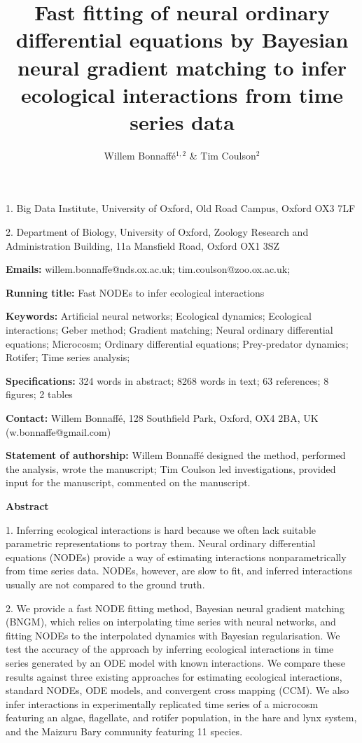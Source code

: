 \documentclass[11pt, oneside]{article}
\title{Fast fitting of neural ordinary differential equations by Bayesian neural gradient matching to infer ecological interactions from time series data}
\author{Willem Bonnaff\'e$^{1,2}$ \& Tim Coulson$^2$}
\date{}
\begin{document}
\maketitle
{}

1. Big Data Institute, University of Oxford, Old Road Campus, Oxford OX3 7LF 

2. Department of Biology, University of Oxford, Zoology Research and Administration Building, 11a Mansfield Road, Oxford OX1 3SZ 

\textbf{Emails:}
willem.bonnaffe@nds.ox.ac.uk;
tim.coulson@zoo.ox.ac.uk;

\textbf{Running title:}
Fast NODEs to infer ecological interactions

\textbf{Keywords:}
Artificial neural networks;
Ecological dynamics;  
Ecological interactions;
Geber method; 
Gradient matching;
Neural ordinary differential equations; 
Microcosm;
Ordinary differential equations; 
Prey-predator dynamics; 
Rotifer;
Time series analysis;

\textbf{Specifications:}  324 words in abstract; 8268 words in text; 63 references; 8 figures; 2 tables

\textbf{Contact:}
Willem Bonnaff\'e, 128 Southfield Park, Oxford, OX4 2BA, UK (w.bonnaffe@gmail.com)

\textbf{Statement of authorship:}
Willem Bonnaff\'e designed the method, performed the analysis, wrote the manuscript; 
Tim Coulson led investigations, provided input for the manuscript, commented on the manuscript.

\newpage
{}

\textbf{Abstract} 

1. Inferring ecological interactions is hard because we often lack suitable parametric representations to portray them.
Neural ordinary differential equations (NODEs) provide a way of estimating interactions nonparametrically from time series data. 
NODEs, however, are slow to fit, and inferred interactions usually are not compared to the ground truth.

2. We provide a fast NODE fitting method, Bayesian neural gradient matching (BNGM), which relies on interpolating time series with neural networks, and fitting NODEs to the interpolated dynamics with Bayesian regularisation.
We test the accuracy of the approach by inferring ecological interactions in time series generated by an ODE model with known interactions. 
We compare these results against three existing approaches for estimating ecological interactions, standard NODEs, ODE models, and convergent cross mapping (CCM).
We also infer interactions in experimentally replicated time series of a microcosm featuring an algae, flagellate, and rotifer population, in the hare and lynx system, and the Maizuru Bary community featuring 11 species.
\end{document}
